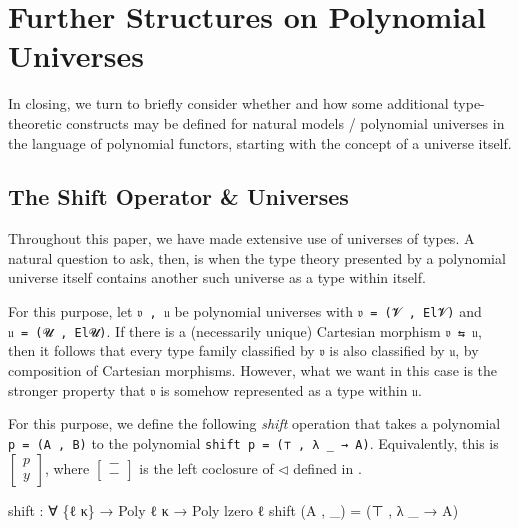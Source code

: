 \documentclass[
  11pt,
  oneside,
  article]{memoir}
\newenvironment{Shaded}{}{}
\newcommand{\NormalTok}[1]{#1}
\newcommand{\OtherTok}[1]{\textcolor[rgb]{0.00,0.44,0.13}{#1}}
\theoremstyle{definition}
\theoremstyle{plain}
\newcommand{\0}{\textsf{0}}
\newcommand{\1}{\tn{\textsf{1}}}
\begin{document}
\chapter{Further Structures on Polynomial
Universes}\label{further-structures-on-polynomial-universes}

In closing, we turn to briefly consider whether and how some additional
type-theoretic constructs may be defined for natural models / polynomial
universes in the language of polynomial functors, starting with the
concept of a universe itself.

\section{The Shift Operator \&
Universes}\label{the-shift-operator-universes}

Throughout this paper, we have made extensive use of universes of types.
A natural question to ask, then, is when the type theory presented by a
polynomial universe itself contains another such universe as a type
within itself.

For this purpose, let \texttt{𝔳\ ,\ 𝔲} be polynomial universes with
\texttt{𝔳\ =\ (𝓥\ ,\ El𝓥)} and \texttt{𝔲\ =\ (𝓤\ ,\ El𝓤)}. If there is a
(necessarily unique) Cartesian morphism \texttt{𝔳\ ⇆\ 𝔲}, then it
follows that every type family classified by \texttt{𝔳} is also
classified by \texttt{𝔲}, by composition of Cartesian morphisms.
However, what we want in this case is the stronger property that
\texttt{𝔳} is somehow represented as a type within \texttt{𝔲}.

For this purpose, we define the following \emph{shift} operation that
takes a polynomial \texttt{p\ =\ (A\ ,\ B)} to the polynomial
\texttt{shift\ p\ =\ (⊤\ ,\ λ\ \_\ →\ A)}. Equivalently, this is
\(\left[ \begin{array}{c} p\\ y \end{array} \right]\), where
\(\left[ \begin{array}{c} -\\ - \end{array} \right]\) is the left
coclosure of \(\triangleleft\) defined in \cite{niu2024polynomial}.

\begin{Shaded}
\begin{Highlighting}[]
\NormalTok{shift }\OtherTok{:} \OtherTok{∀} \OtherTok{\{}\NormalTok{ℓ κ}\OtherTok{\}} \OtherTok{→}\NormalTok{ Poly ℓ κ }\OtherTok{→}\NormalTok{ Poly lzero ℓ}
\NormalTok{shift }\OtherTok{(}\NormalTok{A , }\OtherTok{\_)} \OtherTok{=} \OtherTok{(}\NormalTok{⊤ , }\OtherTok{λ} \OtherTok{\_} \OtherTok{→}\NormalTok{ A}\OtherTok{)}
\end{Highlighting}
\end{Shaded}
\end{document}
